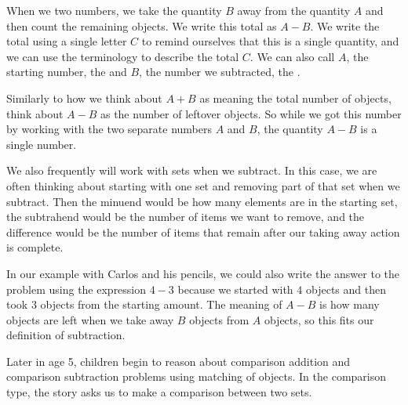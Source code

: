 \documentclass{ximera}
\begin{document}
\begin{definition}
When we  two numbers, we take the quantity $B$ away from the quantity $A$ and then count the remaining objects. We write this total as $A - B$. We write the total using a single letter $C$ to remind ourselves that this is a single quantity, and we can use the terminology  to describe the total $C$. We can also call $A$, the starting number, the  and $B$, the number we subtracted, the .
\begin{image}
\end{image}
\end{definition}

Similarly to how we think about $A+B$ as meaning the total number of objects, think about $A-B$ as the number of leftover objects. So while we got this number by working with the two separate numbers $A$ and $B$, the quantity $A-B$ is a single number. 

We also frequently will work with sets when we subtract. In this case, we are often thinking about starting with one set and removing part of that set when we subtract. Then the minuend would be how many elements are in the starting set, the subtrahend would be the number of items we want to remove, and the difference would be the number of items that remain after our taking away action is complete.

In our example with Carlos and his pencils, we could also write the answer to the problem using the expression $4-3$ because we started with $4$ objects and then took $3$ objects from the starting amount. The meaning of $A-B$ is how many objects are left when we take away $B$ objects from $A$ objects, so this fits our definition of subtraction.


Later in age 5, children begin to reason about comparison addition and comparison subtraction problems using matching of objects. In the comparison type, the story asks us to make a comparison between two sets.
\end{document}
